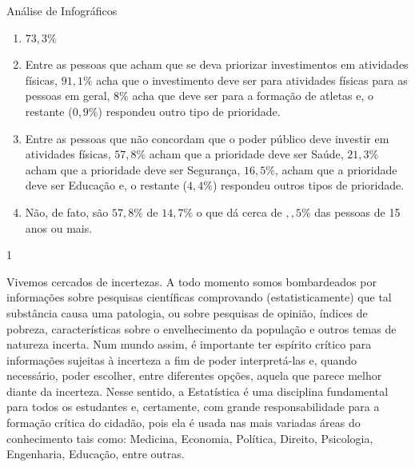 \begin{answer}{Análise de Infográficos}
{\begin{enumerate}[itemsep=2pt]
\item $73,3$\%

\item Entre as pessoas que acham que se deva priorizar investimentos em atividades físicas, $91{,}1\%$ acha que o investimento deve ser para atividades físicas para as pessoas em geral, $8\%$ acha que deve ser para a formação de atletas e, o restante ($0{,}9\%$) respondeu outro tipo de prioridade.

\item Entre as pessoas que não concordam que o poder público deve investir em atividades físicas, $57{,}8$\% acham que a prioridade deve ser Saúde, $21{,}3\%$ acham que a prioridade deve ser Segurança, $16{,}5\%$, acham que a prioridade deve ser Educação e, o restante ($4{,}4\%$) respondeu outros tipos de prioridade.

\item Não, de fato, são $57{,}8\%$ de $14{,}7\%$ o que dá cerca de ${,},5\%$ das pessoas de 15 anos ou mais.

\end{enumerate}
}{1}
\end{answer}

\label{est1-exp-1}
Vivemos cercados de incertezas. A todo momento somos bombardeados por informações sobre pesquisas científicas comprovando (estatisticamente) que tal substância causa uma patologia, ou sobre pesquisas de opinião, índices de pobreza, características sobre o envelhecimento da população e outros temas de natureza incerta. Num mundo assim, é importante ter espírito crítico para informações sujeitas à incerteza a fim de poder interpretá-las e, quando necessário, poder escolher, entre diferentes opções, aquela que parece melhor diante da incerteza. Nesse sentido, a Estatística é uma disciplina fundamental para todos os estudantes e, certamente, com grande responsabilidade para a formação crítica do cidadão, pois ela é usada nas mais variadas áreas do conhecimento tais como: Medicina, Economia, Política, Direito, Psicologia, Engenharia, Educação, entre outras.


